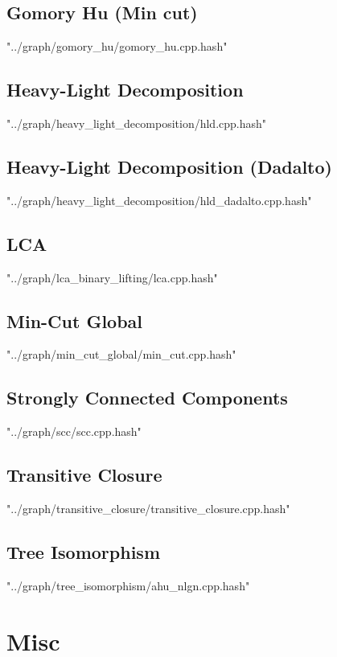 \documentclass [a4paper,5pt,oneside, landscape]{article}
\begin{document}
\begin{multicols}{3}
\subsection{ Gomory Hu (Min cut)}
 {"../graph/gomory_hu/gomory_hu.cpp.hash"}


\subsection{ Heavy-Light Decomposition}
 {"../graph/heavy_light_decomposition/hld.cpp.hash"}


\subsection{ Heavy-Light Decomposition (Dadalto)}
 {"../graph/heavy_light_decomposition/hld_dadalto.cpp.hash"}


\subsection{ LCA}
 {"../graph/lca_binary_lifting/lca.cpp.hash"}


\subsection{ Min-Cut Global}
 {"../graph/min_cut_global/min_cut.cpp.hash"}


\subsection{ Strongly Connected Components}
 {"../graph/scc/scc.cpp.hash"}


\subsection{ Transitive Closure}
 {"../graph/transitive_closure/transitive_closure.cpp.hash"}


\subsection{ Tree Isomorphism}
 {"../graph/tree_isomorphism/ahu_nlgn.cpp.hash"}



\section{Misc}

\end{multicols}
\end{document}
